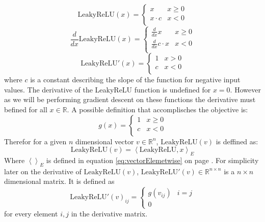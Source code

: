 \documentclass[12pt]{article}
\newcommand{\equationref}[1]{equation \ref{#1} on page \pageref{#1}}
\begin{document}
\begin{equation} \label{eq:NN:ReLU}
\text{LeakyReLU}(x) = \left\{
\begin{array}{ll}
x & x \ge 0 \\
x \cdot c & x < 0 \\
\end{array}
\right.
\end{equation}
\[
\frac{d}{dx} \text{LeakyReLU}(x) = \left\{
\begin{array}{ll}
\frac{d}{dx}x & x \ge 0 \\
\frac{d}{dx}c\cdot x & x < 0 \\
\end{array}
\right.
\]
\begin{equation} \label{eq:NN:Relu_derivative}
\text{LeakyReLU}'(x) = \left\{
\begin{array}{ll}
1 & x > 0 \\
c & x < 0 \\
\end{array}
\right.
\end{equation}
where \(c\) is a constant describing the slope of the function for negative input values. The derivative of the LeakyReLU function is undefined for \(x=0\). However as we will be performing gradient descent on these functions the derivative must befined for all \(x \in \mathbb R\). A possible definition that accomplisches the objective is:
\begin{equation}
g(x) = 
\begin{cases}
1 & x \ge 0\\
c & x < 0\\
\end{cases}
\end{equation}
Therefor for a given \(n\) dimensional vector \(v \in \mathbb R^n\), \(\text{LeakyReLU}(v)\) is deffined as:
\begin{equation}\label{eq:vecTanh}
\text{LeakyReLU}(v) = \left<\text{LeakyReLU}, x\right>_E
\end{equation}
Where \(\left<\right>_E\) is defined in \equationref{eq:vectorElemetwise}. For simplicity later on the derivative of \(\text{LeakyReLU}(v)\), \(\text{LeakyReLU}'(v) \in \mathbb R^{n \times n}\) is a \(n \times n\) dimensional matrix. It is defined as
\begin{equation}
\text{LeakyReLU}'(v)_{ij} = \left\{\begin{matrix}
g(v_{ij}) & i = j \\
0
\end{matrix}\right.
\end{equation}
for every element \(i,j\) in the derivative matrix.
\end{document}
